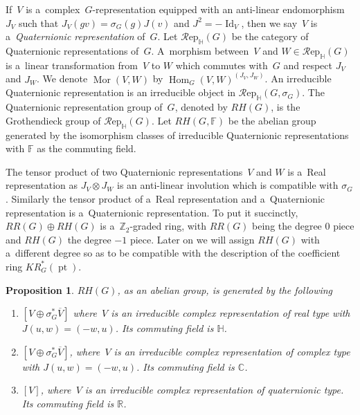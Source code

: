 \documentclass[11pt]{article}
\numberwithin{equation}{section}
\newtheorem{Proposition}[Theorem]{Proposition}
{\theoremstyle{definition}
\newtheorem{Definition}[Theorem]{Definition}
\newtheorem{Example}[Theorem]{Example}
\newtheorem{Remark}[Theorem]{Remark}
}
\DeclareMathOperator{\pt}{pt}
\DeclareMathOperator{\Mor}{Mor}
\DeclareMathOperator{\Hom}{Hom}
\DeclareMathOperator{\Id}{Id}
\begin{document}
\begin{Definition}
If~$V$ is a~complex~$G$-representation equipped with an anti-linear endomor\-phism~$J_V$ such that $J_V(gv)=
\sigma_G(g)J(v)$ and $J^2=-\Id
_V$, then we say~$V$ is a~\emph{Quaternionic representation} of~$G$.
Let $\mathcal{R}\text{ep}_\mathbb{H}(G)$ be the category of Quaternionic representations of~$G$.
A~morphism between~$V$ and $W\in \mathcal{R}\text{ep}_\mathbb{H}(G)$ is a~linear transformation from~$V$ to $W$ which commutes
with~$G$ and respect $J_V$ and $J_W$.
We denote $\Mor(V, W)$ by $\Hom_G(V, W)^{(J_V, J_W)}$.
An irreducible Quaternionic representation is an irreducible object in $\mathcal{R}\text{ep}_\mathbb{H}(G,
\sigma_G)$.
The Quaternionic representation group of~$G$, denoted by $RH(G)$, is the Grothendieck group of $\mathcal{R}\text{ep}_\mathbb{H}(G)$.
Let $RH(G, \mathbb{F})$ be the abelian group generated by the isomorphism classes of irreducible Quaternionic
representations with $\mathbb{F}$ as the commuting f\/ield.
\end{Definition}
\begin{Remark}
The tensor product of two Quaternionic representations~$V$ and $W$ is a~Real representation as $J_V\otimes J_W$ is an
anti-linear involution which is compatible with $\sigma_G$.
Similarly the tensor product of a~Real representation and a~Quaternionic representation is a~Quaternionic
representation.
To put it succinctly, $RR(G)\oplus RH(G)$ is a~$\mathbb{Z}
_2$-graded ring, with $RR(G)$ being the degree $0$ piece and $RH(G)$ the degree $-1$ piece.
Later on we will assign $RH(G)$ with a~dif\/ferent degree so as to be compatible with the description of the coef\/f\/icient
ring $KR^*_G(\pt)$.
\end{Remark}
\begin{Proposition}
\label{quatrepclassification}
$RH(G)$, as an abelian group, is generated by the following
\begin{enumerate}\itemsep=0pt
\item[$1.$]
$[V\oplus
\sigma_G^*\overline{V}]$ where~$V$ is an irreducible complex representation of real type with $J(u, w)=(-w, u)$.
Its commuting field is $\mathbb{H}$.
\item[$2.$]
$[V\oplus\sigma_G^*\overline{V}]$, where~$V$ is an irreducible complex representation of complex type with $J(u, w)=(-w, u)$.
Its commuting field is $\mathbb{C}$.
\item[$3.$]
$[V]$, where~$V$ is an irreducible complex representation of quaternionic type.
Its commuting field is $\mathbb{R}$.
\end{enumerate}
\end{Proposition}
\end{document}
